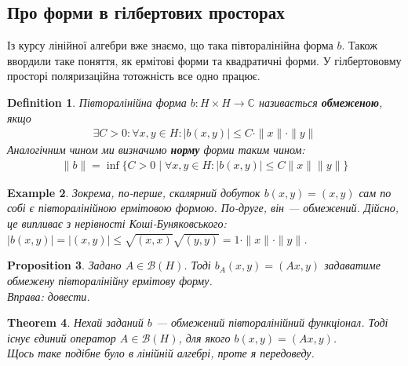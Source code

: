 \documentclass[a4paper, 10pt]{article}
\theoremstyle{theoremdd}
\newtheorem{theorem}{Theorem}[subsection]
\theoremstyle{theoremdd}
\newtheorem{definition}[theorem]{Definition}
\theoremstyle{theoremdd}
\theoremstyle{theoremdd}
\newtheorem{example}[theorem]{Example}
\theoremstyle{theoremdd}
\newtheorem{proposition}[theorem]{Proposition}
\theoremstyle{theoremdd}
\theoremstyle{theoremdd}
\theoremstyle{theoremdd}
\begin{document}
\subsection{Про форми в гілбертових просторах}
Із курсу лінійної алгебри вже знаємо, що така півторалінійна форма $b$. Також ввордили таке поняття, як ермітові форми та квадратичні форми. У гілбертововму просторі поляризаційна тотожність все одно працює.

\begin{definition}
Півторалінійна форма $b \colon H \times H \to \mathbb{C}$ називається \textbf{обмеженою}, якщо
\begin{align*}
\exists C > 0: \forall x,y \in H: |b(x,y)| \leq C \cdot \|x\| \cdot \|y\|
\end{align*}
Аналогічним чином ми визначимо \textbf{норму} форми таким чином:
\begin{align*}
\|b\| = \inf\{C > 0 \mid \forall x, y \in H: |b(x,y)| \leq C\|x\| \|y\|\}
\end{align*}
\end{definition}

\begin{example}
Зокрема, по-перше, скалярний добуток $b(x,y) = (x,y)$ сам по собі є півторалінійною ермітовою формою. По-друге, він --- обмежений. Дійсно, це випливає з нерівності Коші-Буняковського:\\
$|b(x,y)| = |(x,y)| \leq \sqrt{(x,x)} \sqrt{(y,y)} = 1 \cdot \|x\| \cdot \|y\|$.
\end{example}

\begin{proposition}
Задано $A \in \mathcal{B}(H)$. Тоді $b_A(x,y) = (Ax,y)$ задаватиме обмежену півторалінійну ермітову форму.\\
\textit{Вправа: довести.}
\end{proposition}

\begin{theorem}
Нехай заданий $b$ --- обмежений півторалінійний функціонал. Тоді існує єдиний оператор $A \in \mathcal{B}(H)$, для якого $b(x,y) = (Ax,y)$.\\
\textit{Щось таке подібне було в лінійній алгебрі, проте я передоведу.}
\end{theorem}
\end{document}
